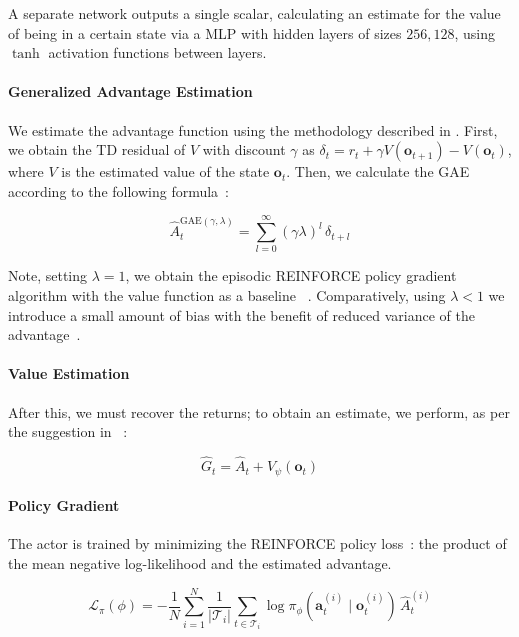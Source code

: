 \documentclass{article}
\begin{document}
A separate network outputs a single scalar, calculating an estimate for the value of being in a certain state via a MLP with hidden layers of sizes $256, 128$, using $\tanh$ activation functions between layers.

\paragraph{Generalized Advantage Estimation}

We estimate the advantage function using the methodology described in \citet{schulman2016}. First, we obtain the TD residual of $V$ with discount $\gamma$ as $\delta_t = r_t + \gamma V(\mathbf{o}_{t+1}) - V(\mathbf{o}_t)$, where $V$ is the estimated value of the state $\mathbf{o}_t$. Then, we calculate the GAE according to the following formula~\citep[Eq.~16]{schulman2016}:

\begin{equation}
    \hat{A}_t^{\text{GAE}(\gamma, \lambda)} = \sum_{l=0}^{\infty} (\gamma \lambda)^l \, \delta_{t+l}
    \label{eq:gae}
\end{equation}

Note, setting $\lambda = 1$, we obtain the episodic REINFORCE policy gradient algorithm with the value function as a baseline ~\citep{williams1992}. Comparatively, using $\lambda < 1$ we introduce a small amount of bias with the benefit of reduced variance of the advantage~\citep{schulman2016}.

\paragraph{Value Estimation}


After this, we must recover the returns; to obtain an estimate, we perform, as per the suggestion in ~\citep{schulman2016}:

\begin{equation}
    \hat{G}_t = \hat{A}_t + V_\psi(\mathbf{o}_t)
    \label{eq:lambda_return}
\end{equation}

\paragraph{Policy Gradient}

The actor is trained by minimizing the REINFORCE policy loss~\citep{williams1992}: the product of the mean negative log-likelihood and the estimated advantage.

\begin{equation}
  \mathcal{L}_\pi(\phi) = -\frac{1}{N} \sum_{i=1}^{N}
  \frac{1}{|\mathcal{T}_i|}\sum_{t \in \mathcal{T}_i}
  \log \pi_\phi(\mathbf{a}_t^{(i)} \mid \mathbf{o}_t^{(i)}) \, \hat{A}_t^{(i)}
  \label{eq:policy_loss}
\end{equation}
\end{document}
